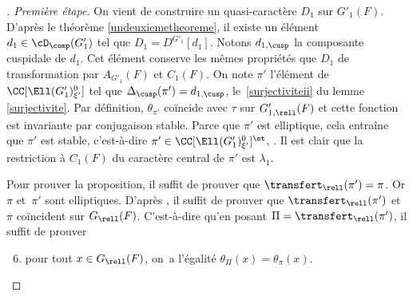 \begin{proof}[\proofname. Première étape]
On vient de construire un quasi-caractère $D_{1}$ sur $G'_{1}(F)$. D'après le théorème \ref{undeuxiemetheoreme}, il existe un élément $d_{1}\in \cD_{\comp}(G'_{1})$ tel que $D_{1}=D^{G'_{1}}[d_{1}]$. Notons $d_{1,\cusp}$ la composante cuspidale de $d_{1}$. Cet élément conserve les mêmes propriétés que $D_{1}$ de transformation par $A_{G'_{1}}(F)$ et $C_{1}(F)$. On note $\pi'$ l'élément de $\CC[\Ell(G'_{1})_{\xi'}^0]$ tel que $\Delta_{\cusp}(\pi')=d_{1,\cusp}$, \cf le~\eqref{surjectiviteii} du lemme \ref{surjectivite}. Par définition, $\theta_{\pi'}$ coïncide avec $\tau$ sur $G'_{1,\rell}(F)$ et cette fonction est invariante par conjugaison stable. Parce que $\pi'$ est elliptique, cela entraîne que $\pi'$ est stable, c'est-à-dire $\pi'\in \CC[\Ell(G'_{1})_{\xi'}^0]^{\st}$, \cf \cite[Th.\,6.1]{A3}.
Il est clair que la restriction à $C_{1}(F)$ du caractère central de $\pi'$ est $\lambda_{1}$.

Pour prouver la proposition, il suffit de prouver que $\transfert_{\rell}(\pi')=\pi$. Or $\pi$ et~$\pi'$ sont elliptiques. D'après \cite[Th.\,6.2]{A3}, il suffit de prouver que $\transfert_{\rell}(\pi')$ et~$\pi$ coïncident sur $G_{\rell}(F)$. C'est-à-dire qu'en posant $\Pi=\transfert_{\rell}(\pi')$,
il suffit de prouver
\begin{enumerate}\setcounter{enumi}{5}
\item\label{unereciproque6}
pour tout $x\in G_{\rell}(F)$, on~a l'égalité $\theta_{\Pi}(x)=\theta_{\pi}(x)$.
\end{enumerate}


\end{proof}
